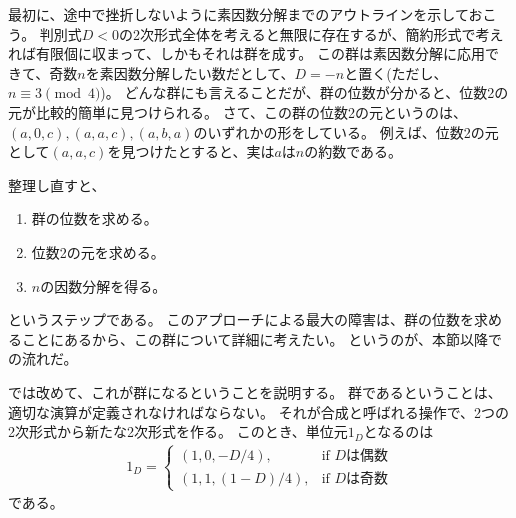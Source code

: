 最初に、途中で挫折しないように素因数分解までのアウトラインを示しておこう。
判別式$D<0$の2次形式全体を考えると無限に存在するが、簡約形式で考えれば有限個に収まって、しかもそれは群を成す。
この群は素因数分解に応用できて、奇数$n$を素因数分解したい数だとして、$D=-n$と置く(ただし、$n\equiv3\pmod{4}$)。
どんな群にも言えることだが、群の位数が分かると、位数2の元が比較的簡単に見つけられる。
さて、この群の位数2の元というのは、$(a,0,c),(a,a,c),(a,b,a)$のいずれかの形をしている。
例えば、位数2の元として$(a,a,c)$を見つけたとすると、実は$a$は$n$の約数である。

整理し直すと、
\begin{enumerate}
 \item 群の位数を求める。
 \item 位数2の元を求める。
 \item $n$の因数分解を得る。
\end{enumerate}
というステップである。
このアプローチによる最大の障害は、群の位数を求めることにあるから、この群について詳細に考えたい。
というのが、本節以降での流れだ。

では改めて、これが群になるということを説明する。
群であるということは、適切な演算が定義されなければならない。
それが合成と呼ばれる操作で、2つの2次形式から新たな2次形式を作る。
このとき、単位元$1_D$となるのは
\begin{align*}
1_D = \begin{cases}
(1, 0, -D/4),& \mbox{if $D$は偶数}\\
(1, 1, (1-D)/4),& \mbox{if $D$は奇数}
\end{cases}
\end{align*}
である。


